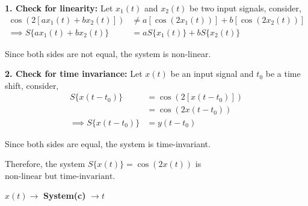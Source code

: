 \documentclass[a4paper, 10pt]{article}
\begin{document}
\begin{solution}
\vspace{2mm}

\par\noindent\textbf{1. Check for linearity:}
Let \( x_1(t) \) and \( x_2(t) \) be two input signals, consider,
\begin{align*}
    \cos(2 [ a x_1(t) + b x_2(t) ]) &\neq a [ \cos(2 x_1(t)) ] + b [ \cos(2 x_2(t)) ] \\
    \implies S\{ a x_1(t) + b x_2(t) \} &= a S\{ x_1(t) \} + b S\{ x_2(t) \}
\end{align*}

Since both sides are not equal, the system is non-linear.

\vspace{2mm}

\par\noindent\textbf{2. Check for time invariance:}
Let \( x(t) \) be an input signal and \( t_0 \) be a time shift, consider,
\begin{align*}
S\{ x(t - t_0) \} &= \cos(2 [ x(t - t_0) ]) \\
&= \cos(2 x(t - t_0)) \\
\implies S\{ x(t - t_0) \} &= y(t - t_0)
\end{align*}

Since both sides are equal, the system is time-invariant.

Therefore, the system \( S\{ x(t) \} = \cos(2x(t)) \) is \( \boxed{\text{non-linear but time-invariant}} \).
\end{solution}

\newpage

\begin{subproblems}[start=3]
    \item \( x(t) \rightarrow \) \textbf{System(c)} \( \rightarrow t \)
\end{subproblems}
\end{document}
